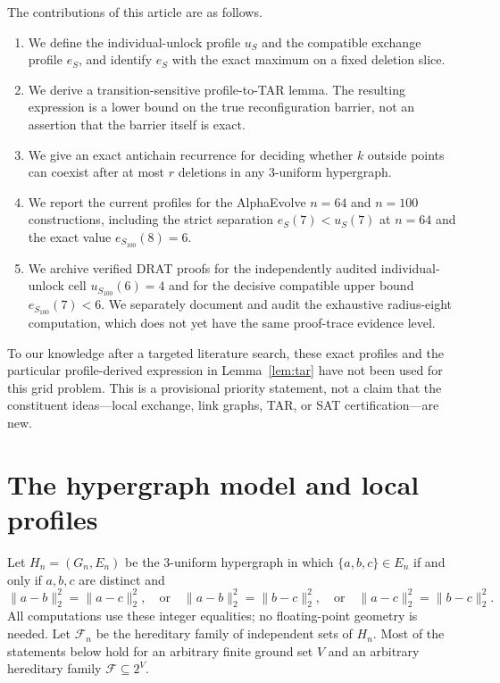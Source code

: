 \documentclass[11pt]{article}
\theoremstyle{definition}
\theoremstyle{remark}
\newcommand{\F}{\mathcal{F}}
\begin{document}
The contributions of this article are as follows.
\begin{enumerate}[leftmargin=*,itemsep=2pt]
  \item We define the individual-unlock profile $u_S$ and the compatible
  exchange profile $e_S$, and identify $e_S$ with the exact maximum on a
  fixed deletion slice.
  \item We derive a transition-sensitive profile-to-TAR lemma.  The resulting
  expression is a lower bound on the true reconfiguration barrier, not an
  assertion that the barrier itself is exact.
  \item We give an exact antichain recurrence for deciding whether $k$ outside
  points can coexist after at most $r$ deletions in any $3$-uniform
  hypergraph.
  \item We report the current profiles for the AlphaEvolve $n=64$ and $n=100$
  constructions, including the strict separation $e_S(7)<u_S(7)$ at $n=64$
  and the exact value $e_{S_{100}}(8)=6$.
  \item We archive verified DRAT proofs for the independently audited
  individual-unlock cell $u_{S_{100}}(6)=4$ and for the decisive compatible
  upper bound $e_{S_{100}}(7)<6$.  We separately document and audit the
  exhaustive radius-eight computation, which does not yet have the same
  proof-trace evidence level.
\end{enumerate}

To our knowledge after a targeted literature search, these exact profiles and
the particular profile-derived expression in Lemma~\ref{lem:tar} have not been
used for this grid problem.  This is a provisional priority statement, not a
claim that the constituent ideas---local exchange, link graphs, TAR, or SAT
certification---are new.

\section{The hypergraph model and local profiles}
\label{sec:definitions}

Let $H_n=(G_n,E_n)$ be the $3$-uniform hypergraph in which
$\{a,b,c\}\in E_n$ if and only if $a,b,c$ are distinct and
\[
 \|a-b\|_2^2=\|a-c\|_2^2,
 \quad\text{or}\quad
 \|a-b\|_2^2=\|b-c\|_2^2,
 \quad\text{or}\quad
 \|a-c\|_2^2=\|b-c\|_2^2.
\]
All computations use these integer equalities; no floating-point geometry is
needed.  Let $\F_n$ be the hereditary family of independent sets of $H_n$.
Most of the statements below hold for an arbitrary finite ground set $V$ and
an arbitrary hereditary family $\F\subseteq 2^V$.
\end{document}
